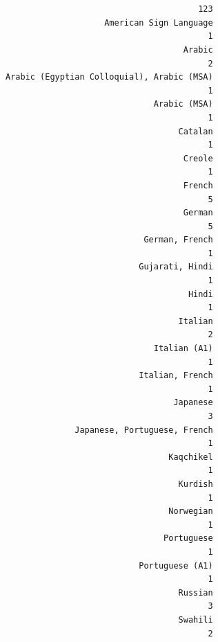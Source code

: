\documentclass[
  letterpaper,
  DIV=11,
  numbers=noendperiod]{scrartcl}
\begin{document}
\begin{verbatim}

                                           
                                       123 
                    American Sign Language 
                                         1 
                                    Arabic 
                                         2 
Arabic (Egyptian Colloquial), Arabic (MSA) 
                                         1 
                              Arabic (MSA) 
                                         1 
                                   Catalan 
                                         1 
                                    Creole 
                                         1 
                                    French 
                                         5 
                                    German 
                                         5 
                            German, French 
                                         1 
                           Gujarati, Hindi 
                                         1 
                                     Hindi 
                                         1 
                                   Italian 
                                         2 
                              Italian (A1) 
                                         1 
                           Italian, French 
                                         1 
                                  Japanese 
                                         3 
              Japanese, Portuguese, French 
                                         1 
                                 Kaqchikel 
                                         1 
                                   Kurdish 
                                         1 
                                 Norwegian 
                                         1 
                                Portuguese 
                                         1 
                           Portuguese (A1) 
                                         1 
                                   Russian 
                                         3 
                                   Swahili 
                                         2 
\end{verbatim}
\end{document}
